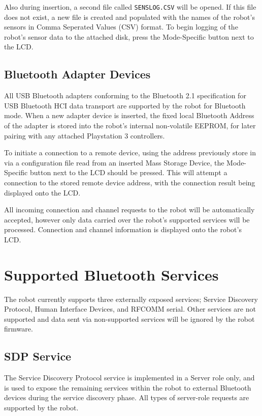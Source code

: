 Also during insertion, a second file called \texttt{SENSLOG.CSV} will be opened. If this file does not exist, a new file is created and populated with the names of the robot's sensors in Comma Seperated Values (CSV) format. To begin logging of the robot's sensor data to the attached disk, press the Mode-Specific button next to the LCD.

\subsection{Bluetooth Adapter Devices}

All USB Bluetooth adapters conforming to the Bluetooth 2.1 specification for USB Bluetooth HCI data transport are supported by the robot for Bluetooth mode. When a new adapter device is inserted, the fixed local Bluetooth Address of the adapter is stored into the robot's internal non-volatile EEPROM, for later pairing with any attached Playstation 3 controllers.

To initiate a connection to a remote device, using the address previously store in via a configuration file read from an inserted Mass Storage Device, the Mode-Specific button next to the LCD should be pressed. This will attempt a connection to the stored remote device address, with the connection result being displayed onto the LCD.

All incoming connection and channel requests to the robot will be automatically accepted, however only data carried over the robot's supported services will be processed. Connection and channel information is displayed onto the robot's LCD.

\section{Supported Bluetooth Services}

The robot currently supports three externally exposed services; Service Discovery Protocol, Human Interface Devices, and RFCOMM serial. Other services are not supported and data sent via non-supported services will be ignored by the robot firmware.

\subsection{SDP Service}

The Service Discovery Protocol service is implemented in a Server role only, and is used to expose the remaining services within the robot to external Bluetooth devices during the service discovery phase. All types of server-role requests are supported by the robot.

